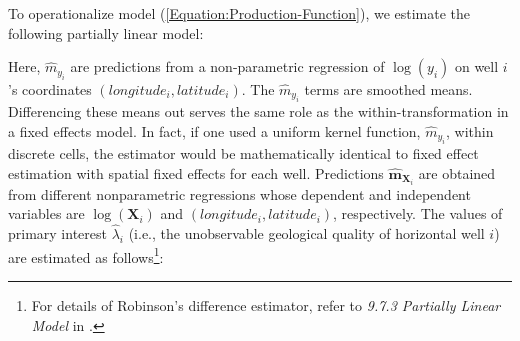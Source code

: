 To operationalize model (\ref{Equation:Production-Function}), we estimate the following partially linear model:

Here, $\widehat{m}_{y_{i}}$ are predictions from a non-parametric regression of $\log \left( y_{i} \right)$ on well $i$'s coordinates $(longitude_{i}, latitude_{i})$. The $\widehat{m}_{y_{i}}$ terms are smoothed means. Differencing these means out serves the same role as the within-transformation in a fixed effects model. In fact, if one used a uniform kernel function, $\widehat{m}_{y_{i}}$, within discrete cells, the estimator would be mathematically identical to fixed effect estimation with spatial fixed effects for each well. Predictions $\widehat{\boldsymbol{m}}_{\boldsymbol{X}_{i}}$ are obtained from different nonparametric regressions whose dependent and independent variables are $\log \left( \boldsymbol{X}_{i} \right)$ and $(longitude_{i}, latitude_{i})$, respectively. The values of primary interest $\widehat{\lambda}_{i}$ (i.e., the unobservable geological quality of horizontal well $i$) are estimated as follows\footnote{For details of Robinson's difference estimator, refer to \textit{9.7.3 Partially Linear Model} in \cite{MicroEconometrics-Methods-and-Applications_Cameron-and-Trivedi_2005}.}:

